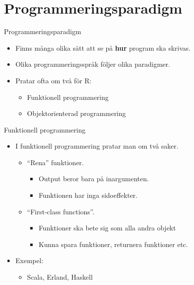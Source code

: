 \documentclass[
  11pt,
  ignorenonframetext,
  handout]{beamer}
\providecommand{\tightlist}{%
  \setlength{\itemsep}{0pt}\setlength{\parskip}{0pt}}
\newcommand\imp[1]{\alert{\textbf{#1}}}
\begin{document}
\hypertarget{programmeringsparadigm}{%
\section{Programmeringsparadigm}\label{programmeringsparadigm}}

\begin{frame}{Programmeringsparadigm}
\protect\hypertarget{programmeringsparadigm-1}{}
\begin{itemize}
\item
  Finns många olika sätt att se på \imp{hur} program ska skrivas.
\item
  Olika programmeringsspråk följer olika paradigmer.
\item
  Pratar ofta om två för R:

  \begin{itemize}
  \tightlist
  \item
    Funktionell programmering
  \item
    Objektorienterad programmering
  \end{itemize}
\end{itemize}
\end{frame}

\begin{frame}{Funktionell programmering}
\protect\hypertarget{funktionell-programmering}{}
\begin{itemize}
\tightlist
\item
  I funktionell programmering pratar man om två saker.

  \begin{itemize}
  \tightlist
  \item
    ``Rena'' funktioner.

    \begin{itemize}
    \tightlist
    \item
      Output beror bara på inargumenten.
    \item
      Funktionen har inga sidoeffekter.
    \end{itemize}
  \item
    ``First-class functions''.

    \begin{itemize}
    \tightlist
    \item
      Funktioner ska bete sig som alla andra objekt
    \item
      Kunna spara funktioner, returnera funktioner etc.
    \end{itemize}
  \end{itemize}
\item
  Exempel:

  \begin{itemize}
  \tightlist
  \item
    Scala, Erland, Haskell
  \end{itemize}
\end{itemize}
\end{frame}
\end{document}
